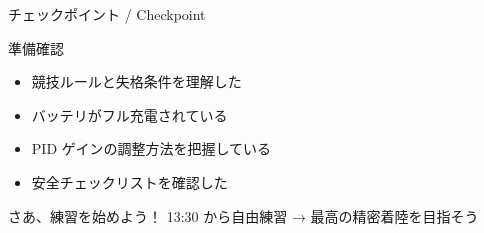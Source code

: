 \documentclass[aspectratio=169, 14pt]{beamer}
\begin{document}
\begin{frame}{チェックポイント / Checkpoint}
  \begin{alertblock}{準備確認}
    \begin{itemize}
      \item[$\square$] 競技ルールと失格条件を理解した
      \item[$\square$] バッテリがフル充電されている
      \item[$\square$] PID ゲインの調整方法を把握している
      \item[$\square$] 安全チェックリストを確認した
    \end{itemize}
  \end{alertblock}

  \vspace{1em}

  \begin{block}{さあ、練習を始めよう！}
    13:30 から自由練習 → 最高の精密着陸を目指そう
  \end{block}
\end{frame}
\end{document}

